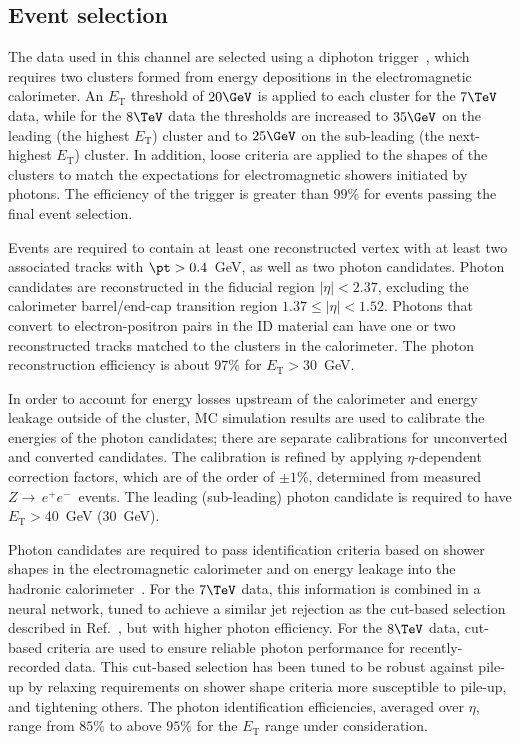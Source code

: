 \documentclass[final,3p,times,twocolumn]{elsarticle}
\newcommand{\ztoee}{\ensuremath{Z{\rightarrow\,}e^+e^-}}
\begin{document}
\subsection{Event selection}
\label{sec:hggselect}
The data used in this channel are selected using a diphoton trigger~\cite{Aad:2012xs},
which requires two clusters formed from energy depositions in the electromagnetic calorimeter.
An $E_{\mathrm{T}}$ threshold of $20\GeV$ is applied to each cluster for the $7\TeV$ data,
while for the $8\TeV$ data
the thresholds are increased to $35\GeV$ on the leading (the highest $E_{\mathrm{T}}$) cluster
and to $25\GeV$ on the sub-leading (the next-highest $E_{\mathrm{T}}$) cluster.
In addition, loose criteria are applied to the shapes of the clusters
to match the expectations for electromagnetic showers initiated by photons.
The efficiency of the trigger is greater than $99\%$ for events passing the final event selection.

Events are required to contain at least one reconstructed vertex with at least two associated tracks with $\pt>0.4$~GeV,
as well as two photon candidates.
Photon candidates are reconstructed in the fiducial region $|\eta|<2.37$, excluding the calorimeter barrel/end-cap transition region $1.37\leq|\eta|<1.52$.
Photons that convert to electron-positron pairs in the ID material
can have one or two reconstructed tracks matched to the clusters in the calorimeter.
The photon reconstruction efficiency is about $97\%$ for $E_{\mathrm{T}}>30$~GeV.

In order to account for energy losses upstream of the calorimeter and energy leakage outside of the cluster,
MC simulation results are used to calibrate the energies of the photon candidates; there are separate
calibrations for unconverted and converted candidates.
The calibration is refined by applying $\eta$-dependent correction factors,
which are of the order of $\pm 1\%$, determined from measured \ztoee\ events. 
The leading (sub-leading) photon candidate is required to have $E_{\mathrm{T}}>40$~GeV (30~GeV).

Photon candidates are required to pass identification criteria based on shower shapes in the electromagnetic calorimeter
and on energy leakage into the hadronic calorimeter~\cite{Aad:2010sp}.
For the $7\TeV$ data, this information is combined in a neural network,
tuned to achieve a similar jet rejection as the cut-based selection described in Ref.~\cite{ATLAS:2012ad}, but with higher photon efficiency.
For the $8\TeV$ data, cut-based criteria are used to ensure reliable photon performance 
for recently-recorded data.
This cut-based selection has been tuned to be robust against pile-up by relaxing requirements
on shower shape criteria more susceptible to pile-up, and tightening others.
The photon identification efficiencies, averaged over $\eta$, range from $85\%$ to above $95\%$ for the $E_{\mathrm{T}}$ range under consideration.
\end{document}
